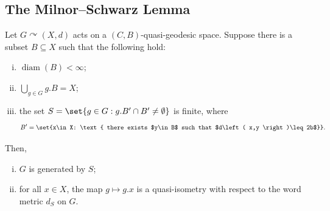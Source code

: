 \documentclass[10pt]{mypackage}
\begin{document}
\subsection{The Milnor--Schwarz Lemma}%
\begin{proposition}
  Let $G\curvearrowright \left( X,d \right)$ acts on a $\left( C,B \right)$-quasi-geodesic space. Suppose there is a subset $B\subseteq X$ such that the following hold:
  \begin{enumerate}[(i)]
    \item $\operatorname{diam}\left( B \right) < \infty$;
    \item $\bigcup_{g\in G}g.B = X$;
    \item the set $S = \set{g\in G : g.B'\cap B'\neq \emptyset}$ is finite, where
      \begin{align*}
        B' = \set{x\in X: \text{ there exists $y\in B$ such that $d\left( x,y \right)\leq 2b$}}.
      \end{align*}
  \end{enumerate}
  Then,
  \begin{enumerate}[(i)]
    \item $G$ is generated by $S$;
    \item for all $x\in X$, the map $g\mapsto g.x$ is a quasi-isometry with respect to the word metric $d_S$ on $G$.
  \end{enumerate}
\end{proposition}
\end{document}
